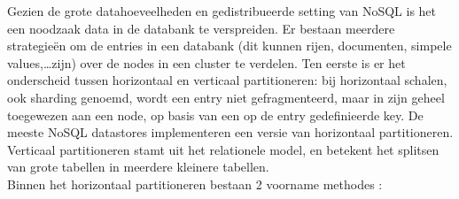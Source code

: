 Gezien de grote datahoeveelheden en gedistribueerde setting van NoSQL is het een noodzaak data in de databank te verspreiden. Er bestaan meerdere strategie\"en om de entries in een databank (dit kunnen rijen, documenten, simpele values,\ldots zijn) over de nodes in een cluster te verdelen. Ten eerste is er het onderscheid tussen horizontaal en verticaal partitioneren: bij horizontaal schalen, ook sharding genoemd, wordt een entry niet gefragmenteerd, maar in zijn geheel toegewezen aan een node, op basis van een op de entry gedefinieerde key. De meeste NoSQL datastores implementeren een versie van horizontaal partitioneren. Verticaal partitioneren stamt uit het relationele model, en betekent het splitsen van grote tabellen in meerdere kleinere tabellen.\\
Binnen het horizontaal partitioneren bestaan 2 voorname methodes \cite{grolinger2013data}:
